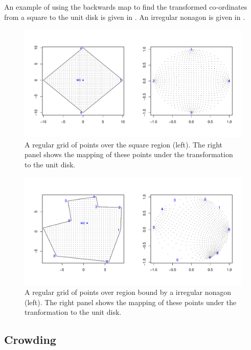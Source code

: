 An example of using the backwards map to find the transformed co-ordinates from a square to the unit disk is given in . An irregular nonagon is given in .


\begin{figure} [bp]
\centering
\includegraphics[scale=0.5]{sc/figs/squaredomain.pdf}
\caption{A regular grid of points over the square region (left). The right panel shows the mapping of these points under the \sch transformation to the unit disk.}
\label{squaredomain}
\end{figure}

\begin{figure} [tbp]
\centering
\includegraphics[scale=0.5]{sc/figs/irregulardomain.pdf}
\caption{A regular grid of points over region bound by a irregular nonagon (left). The right panel shows the mapping of these points under the \sch tranformation to the unit disk.}
\label{irregdomain}
\end{figure}

\subsection{Crowding}

